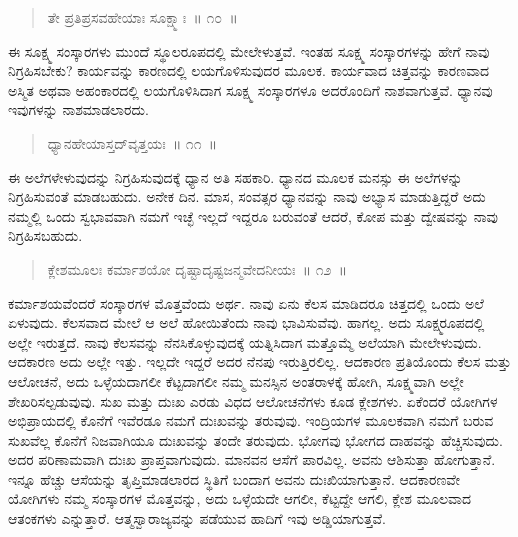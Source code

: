 \vspace{-0.3cm}

\begin{verse}
ತೇ ಪ್ರತಿಪ್ರಸವಹೇಯಾಃ ಸೂಕ್ಷ್ಮಾಃ~॥ ೧೦~॥
\end{verse}

\vspace{-0.3cm}


\vskip 0.2cm 

ಈ ಸೂಕ್ಷ್ಮ ಸಂಸ್ಕಾರಗಳು ಮುಂದೆ ಸ್ಥೂಲರೂಪದಲ್ಲಿ ಮೇಲೇಳುತ್ತವೆ. ಇಂತಹ ಸೂಕ್ಷ್ಮ ಸಂಸ್ಕಾರಗಳನ್ನು ಹೇಗೆ ನಾವು ನಿಗ್ರಹಿಸಬೇಕು? ಕಾರ್ಯವನ್ನು ಕಾರಣದಲ್ಲಿ ಲಯಗೊಳಿಸುವುದರ ಮೂಲಕ. ಕಾರ್ಯವಾದ ಚಿತ್ತವನ್ನು ಕಾರಣವಾದ ಅಸ್ಮಿತ ಅಥವಾ ಅಹಂಕಾರದಲ್ಲಿ ಲಯಗೊಳಿಸಿದಾಗ ಸೂಕ್ಷ್ಮ ಸಂಸ್ಕಾರಗಳೂ ಅದರೊಂದಿಗೆ ನಾಶವಾಗುತ್ತವೆ. ಧ್ಯಾನವು ಇವುಗಳನ್ನು ನಾಶಮಾಡಲಾರದು. 

\vspace{-0.3cm}

\begin{verse}
ಧ್ಯಾನಹೇಯಾಸ್ತದ್​ವೃತ್ತಯಃ~॥ ೧೧~॥
\end{verse}

\vspace{-0.3cm}


\vskip 0.2cm 

ಈ ಅಲೆಗಳೇಳುವುದನ್ನು ನಿಗ್ರಹಿಸುವುದಕ್ಕೆ ಧ್ಯಾನ ಅತಿ ಸಹಕಾರಿ. ಧ್ಯಾನದ ಮೂಲಕ ಮನಸ್ಸು ಈ ಅಲೆಗಳನ್ನು ನಿಗ್ರಹಿಸುವಂತೆ ಮಾಡಬಹುದು. ಅನೇಕ ದಿನ. ಮಾಸ, ಸಂವತ್ಸರ ಧ್ಯಾನವನ್ನು ನಾವು ಅಭ್ಯಾಸ ಮಾಡುತ್ತಿದ್ದರೆ ಅದು ನಮ್ಮಲ್ಲಿ ಒಂದು ಸ್ವಭಾವವಾಗಿ ನಮಗೆ ಇಚ್ಛೆ ಇಲ್ಲದೆ ಇದ್ದರೂ ಬರುವಂತೆ ಆದರೆ, ಕೋಪ ಮತ್ತು ದ್ವೇಷವನ್ನು ನಾವು ನಿಗ್ರಹಿಸಬಹುದು. 

\vspace{-0.3cm}

\begin{verse}
ಕ್ಲೇಶಮೂಲಃ ಕರ್ಮಾಶಯೋ ದೃಷ್ಟಾದೃಷ್ಟಜನ್ಮವೇದನೀಯಃ~॥ ೧೨~॥
\end{verse}

\vspace{-0.3cm}


\vskip 0.2cm 

ಕರ್ಮಾಶಯವೆಂದರೆ ಸಂಸ್ಕಾರಗಳ ಮೊತ್ತವೆಂದು ಅರ್ಥ. ನಾವು ಏನು ಕೆಲಸ ಮಾಡಿದರೂ ಚಿತ್ತದಲ್ಲಿ ಒಂದು ಅಲೆ ಏಳುವುದು. ಕೆಲಸವಾದ ಮೇಲೆ ಆ ಅಲೆ ಹೋಯಿತೆಂದು ನಾವು ಭಾವಿಸುವೆವು. ಹಾಗಲ್ಲ. ಅದು ಸೂಕ್ಷ್ಮರೂಪದಲ್ಲಿ ಅಲ್ಲೇ ಇರುತ್ತದೆ. ನಾವು ಕೆಲಸವನ್ನು ನೆನಸಿಕೊಳ್ಳುವುದಕ್ಕೆ ಯತ್ನಿಸಿದಾಗ ಮತ್ತೊಮ್ಮೆ ಅಲೆಯಾಗಿ ಮೇಲೇಳುವುದು. ಆದಕಾರಣ ಅದು ಅಲ್ಲೇ ಇತ್ತು. ಇಲ್ಲದೇ ಇದ್ದರೆ ಅದರ ನೆನಪು ಇರುತ್ತಿರಲಿಲ್ಲ. ಆದಕಾರಣ ಪ್ರತಿಯೊಂದು ಕೆಲಸ ಮತ್ತು ಆಲೋಚನೆ, ಅದು ಒಳ್ಳೆಯದಾಗಲೀ ಕೆಟ್ಟದಾಗಲೀ ನಮ್ಮ ಮನಸ್ಸಿನ ಅಂತರಾಳಕ್ಕೆ ಹೋಗಿ, ಸೂಕ್ಷ್ಮವಾಗಿ ಅಲ್ಲೇ ಶೇಖರಿಸಲ್ಪಡುವುವು. ಸುಖ ಮತ್ತು ದುಃಖ ಎರಡು ವಿಧದ ಆಲೋಚನೆಗಳು ಕೂಡ ಕ್ಲೇಶಗಳು. ಏಕೆಂದರೆ ಯೋಗಿಗಳ ಅಭಿಪ್ರಾಯದಲ್ಲಿ ಕೊನೆಗೆ ಇವೆರಡೂ ನಮಗೆ ದುಃಖವನ್ನು ತರುವುವು. ಇಂದ್ರಿಯಗಳ ಮೂಲಕವಾಗಿ ನಮಗೆ ಬರುವ ಸುಖವೆಲ್ಲ ಕೊನೆಗೆ ನಿಜವಾಗಿಯೂ ದುಃಖವನ್ನು ತಂದೇ ತರುವುದು. ಭೋಗವು ಭೋಗದ ದಾಹವನ್ನು ಹೆಚ್ಚಿಸುವುದು. ಅದರ ಪರಿಣಾಮವಾಗಿ ದುಃಖ ಪ್ರಾಪ್ತವಾಗುವುದು. ಮಾನವನ ಆಸೆಗೆ ಪಾರವಿಲ್ಲ. ಅವನು ಆಶಿಸುತ್ತಾ ಹೋಗುತ್ತಾನೆ. ಇನ್ನೂ ಹೆಚ್ಚು ಆಸೆಯನ್ನು ತೃಪ್ತಿಮಾಡಲಾರದ ಸ್ಥಿತಿಗೆ ಬಂದಾಗ ಅವನು ದುಃಖಿಯಾಗುತ್ತಾನೆ. ಆದಕಾರಣವೇ ಯೋಗಿಗಳು ನಮ್ಮ ಸಂಸ್ಕಾರಗಳ ಮೊತ್ತವನ್ನು, ಅದು ಒಳ್ಳೆಯದೇ ಆಗಲೀ, ಕೆಟ್ಟದ್ದೇ ಆಗಲಿ, ಕ್ಲೇಶ ಮೂಲವಾದ ಆತಂಕಗಳು ಎನ್ನುತ್ತಾರೆ. ಆತ್ಮಸ್ವಾರಾಜ್ಯವನ್ನು ಪಡೆಯುವ ಹಾದಿಗೆ ಇವು ಅಡ್ಡಿಯಾಗುತ್ತವೆ. 

